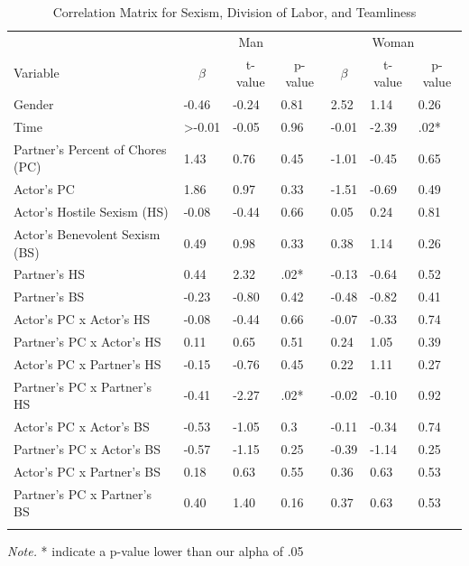 \documentclass[
  man]{apa6}
\begin{document}
\newpage

\begin{table}[tbp]

\begin{center}
\begin{threeparttable}

\caption{\label{tab:table2}Correlation Matrix for Sexism, Division of Labor, and Teamliness}

\begin{tabular}{lllllll}
\toprule
 & \multicolumn{3}{c}{Man} & \multicolumn{3}{c}{Woman} \\
\cmidrule(r){2-4} \cmidrule(r){5-7}
Variable & \multicolumn{1}{c}{$\beta$} & \multicolumn{1}{c}{t-value} & \multicolumn{1}{c}{p-value} & \multicolumn{1}{c}{$\beta$} & \multicolumn{1}{c}{t-value} & \multicolumn{1}{c}{p-value}\\
\midrule
Gender & -0.46 & -0.24 & 0.81 & 2.52 & 1.14 & 0.26\\
Time & >-0.01 & -0.05 & 0.96 & -0.01 & -2.39 & .02*\\
Partner's Percent of Chores (PC) & 1.43 & 0.76 & 0.45 & -1.01 & -0.45 & 0.65\\
Actor's PC & 1.86 & 0.97 & 0.33 & -1.51 & -0.69 & 0.49\\
Actor's Hostile Sexism (HS) & -0.08 & -0.44 & 0.66 & 0.05 & 0.24 & 0.81\\
Actor's Benevolent Sexism (BS) & 0.49 & 0.98 & 0.33 & 0.38 & 1.14 & 0.26\\
Partner's HS & 0.44 & 2.32 & .02* & -0.13 & -0.64 & 0.52\\
Partner's BS & -0.23 & -0.80 & 0.42 & -0.48 & -0.82 & 0.41\\
Actor's PC x Actor's HS & -0.08 & -0.44 & 0.66 & -0.07 & -0.33 & 0.74\\
Partner's PC x Actor's HS & 0.11 & 0.65 & 0.51 & 0.24 & 1.05 & 0.39\\
Actor's PC x Partner's HS & -0.15 & -0.76 & 0.45 & 0.22 & 1.11 & 0.27\\
Partner's PC x Partner's HS & -0.41 & -2.27 & .02* & -0.02 & -0.10 & 0.92\\
Actor's PC x Actor's BS & -0.53 & -1.05 & 0.3 & -0.11 & -0.34 & 0.74\\
Partner's PC x Actor's BS & -0.57 & -1.15 & 0.25 & -0.39 & -1.14 & 0.25\\
Actor's PC x Partner's BS & 0.18 & 0.63 & 0.55 & 0.36 & 0.63 & 0.53\\
Partner's PC x Partner's BS & 0.40 & 1.40 & 0.16 & 0.37 & 0.63 & 0.53\\
\bottomrule
\addlinespace
\end{tabular}

\begin{tablenotes}[para]
\normalsize{\textit{Note.} * indicate a p-value lower than our alpha of .05}
\end{tablenotes}

\end{threeparttable}
\end{center}

\end{table}
\end{document}
